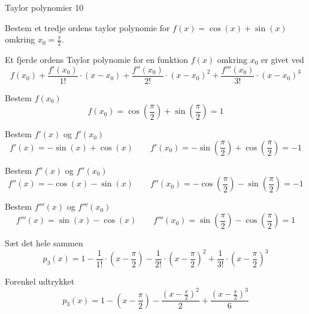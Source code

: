 \documentclass{article}
\begin{document}
\begin{exercise}{Taylor polynomier 10}

Bestem et tredje ordens taylor polynomie for $f(x) = \cos(x) + \sin(x)$
omkring $x_0 = \frac{\pi}{2}$.


\hint
Et fjerde ordens Taylor polynomie for en funktion $f(x)$
omkring $x_0$ er givet ved
\[
f(x_0) + \frac{f'(x_0)}{1!} \cdot (x - x_0)
+ \frac{f''(x_0)}{2!} \cdot (x - x_0)^2
+ \frac{f'''(x_0)}{3!} \cdot (x - x_0)^3
\]


\hint
Bestem $f(x_0)$
\[
f(x_0) = \cos\left( \frac{\pi}{2} \right) + \sin\left( \frac{\pi}{2} \right) = 1
\]

\hint
Bestem $f'(x)$ og $f'(x_0)$
\[
f'(x) = - \sin(x) + \cos(x) \qquad f'(x_0)= - \sin\left( \frac{\pi}{2} \right) + \cos\left( \frac{\pi}{2} \right) = -1
\]

\hint
Bestem $f''(x)$ og $f''(x_0)$
\[
f''(x) = - \cos(x) - \sin(x) \qquad f''(x_0) = - \cos\left( \frac{\pi}{2} \right) - \sin\left( \frac{\pi}{2} \right) = -1
\]

\hint
Bestem $f'''(x)$ og $f'''(x_0)$
\[
f'''(x) = \sin(x) - \cos(x) \qquad f'''(x_0) = \sin\left( \frac{\pi}{2} \right) - \cos\left( \frac{\pi}{2} \right) = 1
\]

\hint
Sæt det hele sammen
\[
p_3(x) = 1 - \frac{1}{1!}\cdot \left( x - \frac{\pi}{2} \right) - \frac{1}{2!} \cdot \left( x - \frac{\pi}{2} \right)^2 + \frac{1}{3!}\cdot \left( x - \frac{\pi}{2} \right)^3
\]

\hint
Forenkel udtrykket
\[
p_3(x) = 1 - \left( x - \frac{\pi}{2} \right) - \frac{\left( x - \frac{\pi}{2} \right)^2}{2} + \frac{\left( x - \frac{\pi}{2} \right)^3}{6}
\]


\end{exercise}
\end{document}
